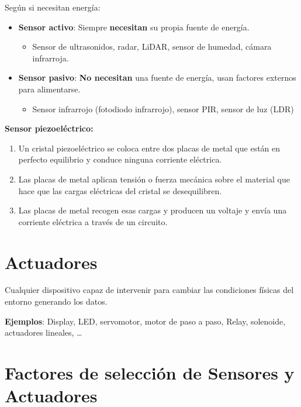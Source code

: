 \documentclass[12pt, twoside, openright]{report} %
\begin{document}
Según si necesitan energía:

\begin{itemize}
	\item \textbf{Sensor activo}: Siempre \textbf{necesitan} su propia fuente de
	      energía.

	      \begin{itemize}
		      \item Sensor de ultrasonidos, radar, LiDAR, sensor de humedad, cámara
		            infrarroja.
	      \end{itemize}
	\item \textbf{Sensor pasivo}: \textbf{No necesitan} una fuente de energía,
	      usan factores externos para alimentarse.

	      \begin{itemize}
		      \item Sensor infrarrojo (fotodiodo infrarrojo), sensor PIR, sensor de luz
		            (LDR)
	      \end{itemize}
\end{itemize}
\pagebreak

\textbf{Sensor piezoeléctrico:}

\begin{enumerate}
	\def\labelenumi{\arabic{enumi}.}
	\item Un cristal piezoeléctrico se coloca entre dos placas de metal que
	      están en perfecto equilibrio y conduce ninguna corriente eléctrica.
	\item Las placas de metal aplican tensión o fuerza mecánica sobre el
	      material que hace que las cargas eléctricas del cristal se
	      desequilibren.
	\item Las placas de metal recogen esas cargas y producen un voltaje y envía
	      una corriente eléctrica a través de un circuito.
\end{enumerate}

\section{Actuadores}

Cualquier dispositivo capaz de intervenir para cambiar las condiciones
físicas del entorno generando los datos.

\textbf{Ejemplos}: Display, LED, servomotor, motor de paso a paso,
Relay, solenoide, actuadores lineales, \ldots{}

\section{Factores de selección de Sensores y
  Actuadores}
\end{document}
